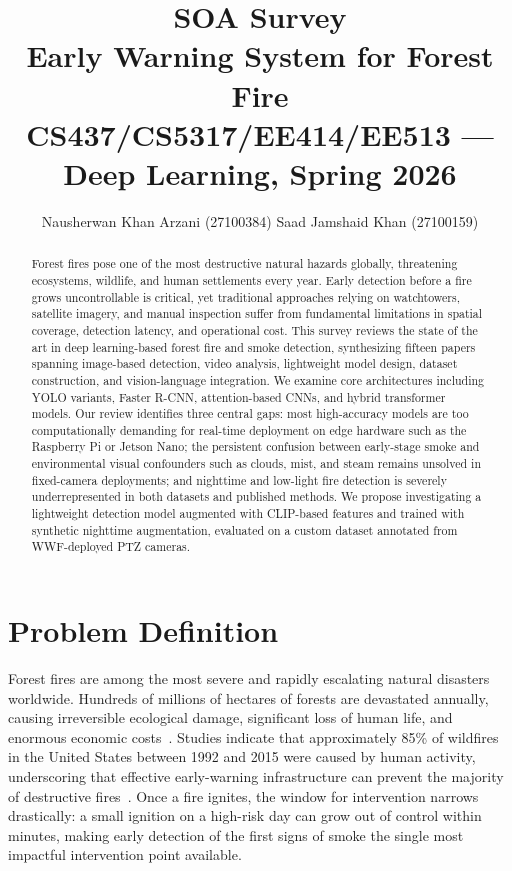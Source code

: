 \documentclass[11pt,twocolumn]{article}
\title{
    \vspace{-1cm}
    {\large \textbf{SOA Survey}} \\[0.3em]
    {\LARGE Early Warning System for Forest Fire} \\[0.5em]
    {\normalsize CS437/CS5317/EE414/EE513 --- Deep Learning, Spring 2026}
}
\author{
    Nausherwan Khan Arzani (27100384) \quad Saad Jamshaid Khan (27100159)
}
\date{}
\begin{document}
\maketitle
\thispagestyle{fancy}

\begin{abstract}
Forest fires pose one of the most destructive natural hazards globally,
threatening ecosystems, wildlife, and human settlements every year.
Early detection before a fire grows uncontrollable is critical, yet
traditional approaches relying on watchtowers, satellite imagery, and
manual inspection suffer from fundamental limitations in spatial
coverage, detection latency, and operational cost. This survey reviews
the state of the art in deep learning-based forest fire and smoke
detection, synthesizing fifteen papers spanning image-based detection,
video analysis, lightweight model design, dataset construction, and
vision-language integration. We examine core architectures including
YOLO variants, Faster R-CNN, attention-based CNNs, and hybrid
transformer models. Our review identifies three central gaps: most
high-accuracy models are too computationally demanding for real-time
deployment on edge hardware such as the Raspberry Pi or Jetson Nano;
the persistent confusion between early-stage smoke and environmental
visual confounders such as clouds, mist, and steam remains unsolved
in fixed-camera deployments; and nighttime and low-light fire detection
is severely underrepresented in both datasets and published methods.
We propose investigating a lightweight detection model augmented with
CLIP-based features and trained with synthetic nighttime augmentation,
evaluated on a custom dataset annotated from WWF-deployed PTZ cameras.
\end{abstract}

\section{Problem Definition}
\label{sec:problem}

Forest fires are among the most severe and rapidly escalating natural
disasters worldwide. Hundreds of millions of hectares of forests are
devastated annually, causing irreversible ecological damage, significant
loss of human life, and enormous economic costs~\cite{martinez2008}.
Studies indicate that approximately 85\% of wildfires in the United
States between 1992 and 2015 were caused by human activity, underscoring
that effective early-warning infrastructure can prevent the majority of
destructive fires~\cite{bouguettaya2022}. Once a fire ignites, the
window for intervention narrows drastically: a small ignition on a
high-risk day can grow out of control within minutes, making early
detection of the first signs of smoke the single most impactful
intervention point available.
\end{document}
